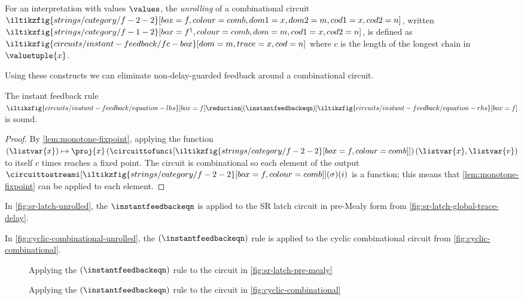 \documentclass{lmcs}
\begin{document}
\begin{defi}[Unrolling]\label{def:unrolling}
    For an interpretation with values \(\values\), the \emph{unrolling}
    of a combinational circuit \(
    \iltikzfig{strings/category/f-2-2}[box=f,colour=comb,dom1=x,dom2=m,cod1=x,cod2=n]
    \), written \(
    \iltikzfig{strings/category/f-1-2}[box=f^\dagger,colour=comb,dom=m,cod1=x,cod2=n]
    \), is defined as \(
    \iltikzfig{circuits/instant-feedback/fc-box}[dom=m,trace=x,cod=n]
    \) where \(c\) is the length of the longest chain in \(\valuetuple{x}\).
\end{defi}

Using these constructs we can eliminate non-delay-guarded feedback around a
combinational circuit.

\begin{prop}\label{prop:instant-feedback}
    The instant feedback rule \(
    \iltikzfig{circuits/instant-feedback/equation-lhs}[box=f]
    \reduction[(\instantfeedbackeqn)]
    \iltikzfig{circuits/instant-feedback/equation-rhs}[box=f]
    \) is sound.
\end{prop}
\begin{proof}
    By \autoref{lem:monotone-fixpoint}, applying the function \(
    (\listvar{x}) \mapsto \proj{x}\left(\circuittofunci[
        \iltikzfig{strings/category/f-2-2}[box=f,colour=comb]
    ]\right)(\listvar{x}, \listvar{v})\) to itself \(c\) times reaches a
    fixed point.
    The circuit is combinational so each element of the output
    \(\circuittostreami[
        \iltikzfig{strings/category/f-2-2}[box=f,colour=comb]
    ](\sigma)(i)\) is a function; this means that \autoref{lem:monotone-fixpoint}
    can be applied to each element.
\end{proof}

\begin{exa}\label{ex:sr-latch-unrolled}
    In \autoref{fig:sr-latch-unrolled}, the \(\instantfeedbackeqn\) is applied to
    the SR latch circuit in pre-Mealy form from
    \autoref{fig:sr-latch-global-trace-delay}.
\end{exa}

\begin{exa}
    In \autoref{fig:cyclic-combinational-unrolled}, the \((\instantfeedbackeqn)\)
    rule is applied to the cyclic combinational circuit from
    \autoref{fig:cyclic-combinational}.
\end{exa}

\begin{figure}
    \centering
    \caption{
        Applying the \((\instantfeedbackeqn)\) rule to the circuit in
        \autoref{fig:sr-latch-pre-mealy}
    }
    \label{fig:sr-latch-unrolled}
\end{figure}
%
\begin{figure}
    \centering
    \caption{
        Applying the \((\instantfeedbackeqn)\) rule to the circuit in
        \autoref{fig:cyclic-combinational}
    }
    \label{fig:cyclic-combinational-unrolled}
\end{figure}
\end{document}
